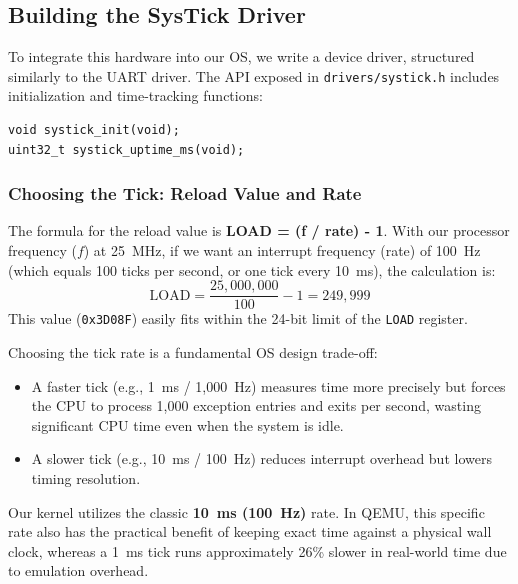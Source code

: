 \subsection{Building the SysTick Driver}
To integrate this hardware into our OS, we write a device driver, structured similarly to the UART driver. The API exposed in \texttt{drivers/systick.h} includes initialization and time-tracking functions:

\begin{lstlisting}
void systick_init(void);
uint32_t systick_uptime_ms(void);
\end{lstlisting}

\subsubsection{Choosing the Tick: Reload Value and Rate}
The formula for the reload value is \textbf{LOAD = (f / rate) - 1}. With our processor frequency ($f$) at 25~MHz, if we want an interrupt frequency (rate) of 100~Hz (which equals 100 ticks per second, or one tick every 10~ms), the calculation is:
$$ \text{LOAD} = \frac{25,000,000}{100} - 1 = 249,999 $$
This value (\texttt{0x3D08F}) easily fits within the 24-bit limit of the \texttt{LOAD} register.

Choosing the tick rate is a fundamental OS design trade-off:
\begin{itemize}
    \item A faster tick (e.g., 1~ms / 1,000~Hz) measures time more precisely but forces the CPU to process 1,000 exception entries and exits per second, wasting significant CPU time even when the system is idle.
    \item A slower tick (e.g., 10~ms / 100~Hz) reduces interrupt overhead but lowers timing resolution.
\end{itemize}
Our kernel utilizes the classic \textbf{10~ms (100~Hz)} rate. In QEMU, this specific rate also has the practical benefit of keeping exact time against a physical wall clock, whereas a 1~ms tick runs approximately 26\% slower in real-world time due to emulation overhead.

